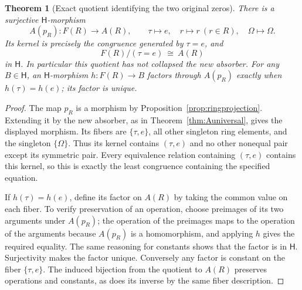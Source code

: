 \documentclass[11pt]{article}
\newtheorem{theorem}{Theorem}[section]
\theoremstyle{definition}
\newcommand{\HH}{\mathsf H}
\newcommand{\Om}{\Omega}
\begin{document}
\begin{theorem}[Exact quotient identifying the two original zeros]
\label{thm:quotientA}
There is a surjective \(\HH\)-morphism
\[
 A(p_R):F(R)\longrightarrow A(R),\qquad
 \tau\longmapsto e,\quad r\longmapsto r\ (r\in R),\quad
 \Om\longmapsto\Om.
\tag{6}\label{eq:Aprojection}
\]
Its kernel is precisely the congruence generated by \(\tau=e\), and
\[
 F(R)/(\tau=e)\ \cong\ A(R)
\tag{7}\label{eq:Aquotient}
\]
in \(\HH\). In particular this quotient has not collapsed the new
absorber. For any \(B\in\HH\), an \(\HH\)-morphism \(h:F(R)\to B\)
factors through \(A(p_R)\) exactly when \(h(\tau)=h(e)\); its factor
is unique.
\end{theorem}
\begin{proof}
The map \(p_R\) is a morphism by Proposition~\ref{prop:ringprojection}.
Extending it by the new absorber, as in Theorem~\ref{thm:Auniversal},
gives the displayed morphism. Its fibers are \(\{\tau,e\}\), all
other singleton ring elements, and the singleton \(\{\Om\}\).
Thus its kernel contains \((\tau,e)\) and no other nonequal pair
except its symmetric pair. Every equivalence relation containing
\((\tau,e)\) contains this kernel, so this is exactly the least
congruence containing the specified equation.

If \(h(\tau)=h(e)\), define its factor on \(A(R)\) by taking the common
value on each fiber. To verify preservation of an operation, choose
preimages of its two arguments under \(A(p_R)\); the operation of the
preimages maps to the operation of the arguments because \(A(p_R)\)
is a homomorphism, and applying \(h\) gives the required equality.
The same reasoning for constants shows that the factor is in \(\HH\).
Surjectivity makes the factor unique. Conversely any factor is constant
on the fiber \(\{\tau,e\}\). The induced bijection from the quotient
to \(A(R)\) preserves operations and constants, as does its inverse by
the same fiber description.
\end{proof}
\end{document}
